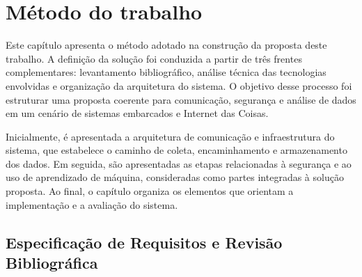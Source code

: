 \chapter{Método do trabalho} \label{cap:metodo}


Este capítulo apresenta o método adotado na construção da proposta deste trabalho. A definição da solução foi conduzida a partir de três frentes complementares: levantamento bibliográfico, análise técnica das tecnologias envolvidas e organização da arquitetura do sistema. O objetivo desse processo foi estruturar uma proposta coerente para comunicação, segurança e análise de dados em um cenário de sistemas embarcados e Internet das Coisas.

Inicialmente, é apresentada a arquitetura de comunicação e infraestrutura do sistema, que estabelece o caminho de coleta, encaminhamento e armazenamento dos dados. Em seguida, são apresentadas as etapas relacionadas à segurança e ao uso de aprendizado de máquina, consideradas como partes integradas à solução proposta. Ao final, o capítulo organiza os elementos que orientam a implementação e a avaliação do sistema.




\section{Especificação de Requisitos e Revisão Bibliográfica}






